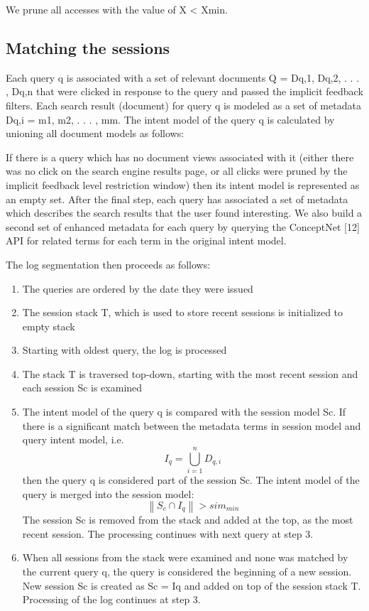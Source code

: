 \documentclass{acm_proc_article-sp} %
\begin{document}
We prune all accesses with the value of X < Xmin.

\subsection{ Matching the sessions}

Each query q is associated with a set of relevant documents
Q = {Dq,1, Dq,2, . . . , Dq,n} that were clicked in response to
the query and passed the implicit feedback filters. Each
search result (document) for query q is modeled as a set of
metadata Dq,i = {m1, m2, . . . , mm}.
The intent model of the query q is calculated by unioning
all document models as follows:

If there is a query which has no document views associated
with it (either there was no click on the search engine results
page, or all clicks were pruned by the implicit feedback level
restriction window) then its intent model is represented as
an empty set.
After the final step, each query has associated a set of metadata
which describes the search results that the user found
interesting. We also build a second set of enhanced metadata
for each query by querying the ConceptNet [12] API
for related terms for each term in the original intent model.

The log segmentation then proceeds as follows:


\begin{enumerate} 
	\item The queries are ordered by the date they were issued
	\item The session stack T, which is used to store recent sessions
	is initialized to empty stack
	\item  Starting with oldest query, the log is processed
	\item  The stack T is traversed top-down, starting with the
	most recent session and each session Sc is examined
	\item  The intent model of the query q is compared with the
	session model Sc. If there is a significant match between
	the metadata terms in session model and query
	intent model, i.e.
	\begin{equation} I_{q} = \bigcup_{i=1}^{n} D_{q,i} \end{equation}
	then the query q is considered part of the session Sc.
	The intent model of the query is merged into the session
	model:
	\begin{equation} \left \| S_{c} \cap I_{q} \right \| > sim_{min} \end{equation}
	The session Sc is removed
	from the stack and added at the top, as the most recent
	session. The processing continues with next query
	at step 3.
	\item When all sessions from the stack were examined and
	none was matched by the current query q, the query is
	considered the beginning of a new session. New session
	Sc is created as Sc = Iq and added on top of the session
	stack T. Processing of the log continues at step 3.
\end{enumerate}
\end{document}
